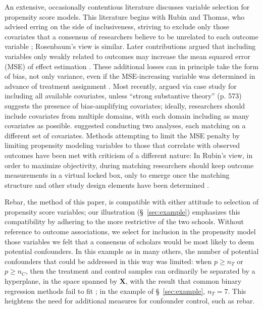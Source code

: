 \documentclass[12pt]{article}\usepackage[]{graphicx}\usepackage[]{color}
\newcommand{\bx}{\bm{X}}
\begin{document}
An extensive, occasionally contentious literature discusses variable selection for propensity
score models.
This literature begins with Rubin and Thomas, who advised
erring on the side of inclusiveness, striving to exclude only those
covariates that a consensus of researchers believe to be unrelated to each outcome
variable \citeyearpar[\S~2.3]{rubin:thom:1996}; Rosenbaum's
\citeyearpar[p.76]{rosenbaum:2002} view is similar.  Later contributions
argued that including variables only weakly related to outcomes may
increase the mean squared error (MSE) of effect estimation \citep{brookhart2006variable,austin2011introduction}.  These
additional losses can in principle take the form of bias,
not only variance, even if the MSE-increasing variable was determined in
advance of treatment assignment
\citep{greenland2003qbc,sjolander2009propensity,pearl2009letter}. %
Most recently,
\citet{steiner2015bias} argued via case study for including all
available covariates, unless ``strong substantive theory'' (p. 573)
suggests the presence of bias-amplifying covariates; ideally,
researchers should include covariates from multiple domains, with each domain including as many
covariates as possible. \citet{pimentel2016constructed} suggested
conducting two analyses, each matching on a different set of covariates.
Methods
attempting to limit the MSE penalty by limiting propensity modeling
variables to those that correlate with observed outcomes have
been met with criticism of a different nature: In Rubin's view, in
order to maximize objectivity, during matching researchers
should keep outcome measurements in a virtual locked box, only to
emerge once the matching structure and other study design elements
have been determined \citep{rubin2008objective}.

Rebar, the method of this paper, is compatible with either attitude to
selection of propensity score variables; our illustration (\S~\ref{sec:example}) emphasizes this
compatibility by adhering to the more restrictive of the two schools.
Without reference to outcome associations, we select for inclusion in
the propensity model those variables we felt that a consensus of
scholars would be most likely to deem potential confounders.  In this
example as in many others, the number of
potential confounders that could  be addressed in this way was
limited: when $p\ge n_T$ or $p\ge n_{C}$, then the
treatment and control samples can ordinarily be separated by
a hyperplane, in the space spanned by
$\bx$, with the result that common binary regression methods
fail to fit \citep{agresti2002categorical,zorn2005solution}; in the
example of \S~\ref{sec:example}, $n_{T}=7$. This heightens the need for additional
measures for confounder control, such as rebar.
\end{document}
